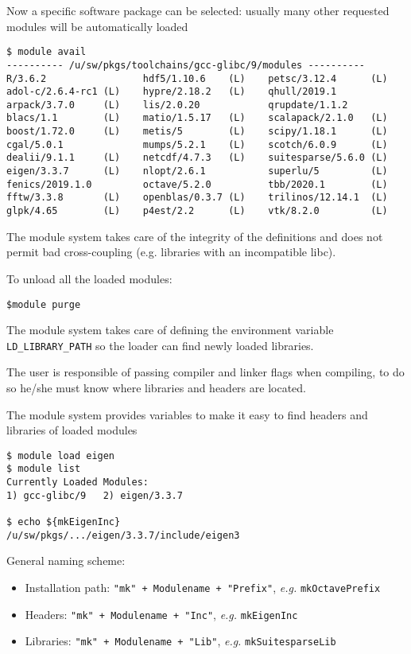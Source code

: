\documentclass[10pt]{beamer}
\begin{document}
\begin{frame}[fragile]
\small
Now a specific software package can be selected: usually many other requested modules will be automatically loaded
\begin{verbatim}
$ module avail
---------- /u/sw/pkgs/toolchains/gcc-glibc/9/modules ----------
R/3.6.2                 hdf5/1.10.6    (L)    petsc/3.12.4      (L)
adol-c/2.6.4-rc1 (L)    hypre/2.18.2   (L)    qhull/2019.1
arpack/3.7.0     (L)    lis/2.0.20            qrupdate/1.1.2
blacs/1.1        (L)    matio/1.5.17   (L)    scalapack/2.1.0   (L)
boost/1.72.0     (L)    metis/5        (L)    scipy/1.18.1      (L)
cgal/5.0.1              mumps/5.2.1    (L)    scotch/6.0.9      (L)
dealii/9.1.1     (L)    netcdf/4.7.3   (L)    suitesparse/5.6.0 (L)
eigen/3.3.7      (L)    nlopt/2.6.1           superlu/5         (L)
fenics/2019.1.0         octave/5.2.0          tbb/2020.1        (L)
fftw/3.3.8       (L)    openblas/0.3.7 (L)    trilinos/12.14.1  (L)
glpk/4.65        (L)    p4est/2.2      (L)    vtk/8.2.0         (L)
\end{verbatim}

The module system takes care of the integrity of the definitions and does not permit bad cross-coupling (e.g. libraries with an incompatible libc).\smallskip

To unload all the loaded modules:
\begin{verbatim}
$module purge
\end{verbatim}
\end{frame}


\begin{frame}[fragile]

The module system takes care of defining the environment variable \texttt{LD\_LIBRARY\_PATH} so the loader can find newly loaded libraries.

The user is responsible of passing compiler and linker flags when compiling, to do so he/she must know where libraries and headers are located.

The module system provides variables to make it easy to find headers and libraries of loaded modules

\begin{verbatim}
$ module load eigen
$ module list
Currently Loaded Modules:
1) gcc-glibc/9   2) eigen/3.3.7

$ echo ${mkEigenInc}
/u/sw/pkgs/.../eigen/3.3.7/include/eigen3
\end{verbatim}

General naming scheme: 
\begin{itemize}
\item Installation path: {\tt "mk" + Modulename + "Prefix"}, {\it e.g.} {\tt mkOctavePrefix}
\item Headers: {\tt "mk" + Modulename + "Inc"}, {\it e.g.} {\tt mkEigenInc}
\item Libraries: {\tt "mk" + Modulename + "Lib"}, {\it e.g.} {\tt mkSuitesparseLib}
\end{itemize}
\end{frame}
\end{document}
